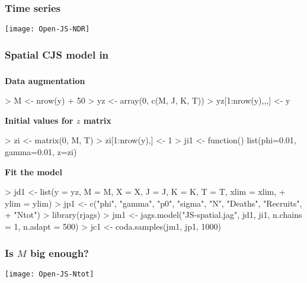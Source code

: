 \documentclass[color=usenames,dvipsnames]{beamer}
\begin{document}
\begin{frame}[fragile]
  \frametitle{Time series}
  \tiny
\vspace{-3mm}
\begin{center}
  \texttt{[image: Open-JS-NDR]}
\end{center}
\end{frame}



\begin{frame}[fragile]
  \frametitle{Spatial CJS model in \jags}
  \vspace{-5mm}
  \tiny \fbox{\parbox{\linewidth}{}}
\end{frame}





\begin{frame}[fragile]
  \frametitle{\jags}
  {\bf Data augmentation}
  \scriptsize
\begin{Schunk}
\begin{Sinput}
> M <- nrow(y) + 50
> yz <- array(0, c(M, J, K, T))
> yz[1:nrow(y),,,] <- y
\end{Sinput}
\end{Schunk}
\pause
\vfill
  {\bf \normalsize Initial values for $z$ matrix}
\begin{Schunk}
\begin{Sinput}
> zi <- matrix(0, M, T)
> zi[1:nrow(y),] <- 1
> ji1 <- function() list(phi=0.01, gamma=0.01, z=zi)
\end{Sinput}
\end{Schunk}
\pause
\vfill
  {\bf \normalsize Fit the model}
\begin{Schunk}
\begin{Sinput}
> jd1 <- list(y = yz, M = M, X = X, J = J, K = K, T = T, xlim = xlim, 
+     ylim = ylim)
> jp1 <- c("phi", "gamma", "p0", "sigma", "N", "Deaths", "Recruits", 
+     "Ntot")
> library(rjags)
> jm1 <- jags.model("JS-spatial.jag", jd1, ji1, n.chains = 1, n.adapt = 500)
> jc1 <- coda.samples(jm1, jp1, 1000)
\end{Sinput}
\end{Schunk}
\end{frame}




\begin{frame}
  \frametitle{Is $M$ big enough?}
\texttt{[image: Open-JS-Ntot]}
\end{frame}
\end{document}
